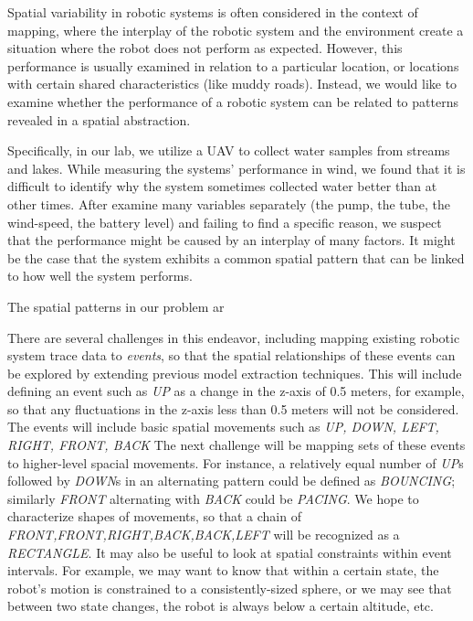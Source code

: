 Spatial variability in robotic systems is often considered in the context of mapping, where the interplay of the robotic system and the environment create a situation where the robot does not perform as expected.
However, this performance is usually examined in relation to a particular location, or locations with certain shared characteristics (like muddy roads).
Instead, we would like to examine whether the performance of a robotic system can be related to patterns revealed in a spatial abstraction.

Specifically, in our lab, we utilize a UAV to collect water samples from streams and lakes.
While measuring the systems' performance in wind, we found that it is difficult to identify why the system sometimes collected water better than at other times.
After examine many variables separately (the pump, the tube, the wind-speed, the battery level) and failing to find a specific reason, we suspect that the performance might be caused by an interplay of many factors.
It might be the case that the system exhibits a common spatial pattern that can be linked to how well the system performs.



The spatial patterns in our problem ar

There are several challenges in this endeavor, including mapping existing robotic system trace data to \emph{events}, so that the spatial relationships of these events can be explored by extending previous model extraction techniques. 
This will include defining an event such as \emph{UP} as a change in the z-axis of 0.5 meters, for example, so that any fluctuations in the z-axis less than 0.5 meters will not be considered.  
The events will include basic spatial movements such as \emph{UP, DOWN, LEFT, RIGHT, FRONT, BACK} 
The next challenge will be mapping sets of these events to higher-level spacial movements.  
For instance, a relatively equal number of \emph{UP}s followed by \emph{DOWN}s in an alternating pattern could be defined as \emph{BOUNCING}; similarly \emph{FRONT} alternating with \emph{BACK} could be \emph{PACING}.
We hope to characterize shapes of movements, so that a chain of \emph{FRONT,FRONT,RIGHT,BACK,BACK,LEFT} will be recognized as a \emph{RECTANGLE}.
It may also be useful to look at spatial constraints within event intervals.  
For example, we may want to know that within a certain state, the robot's motion is constrained to a consistently-sized sphere, or we may see that between two state changes, the robot is always below a certain altitude, etc.

